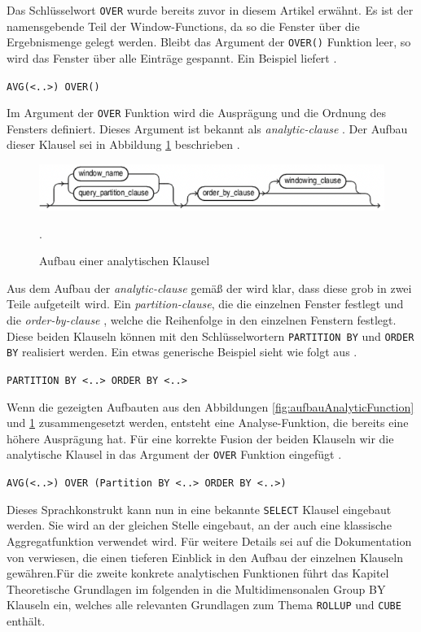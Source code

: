 Das Schlüsselwort \texttt{OVER} wurde bereits zuvor in diesem Artikel erwähnt.
Es ist der namensgebende Teil der Window-Functions, da so die Fenster über die Ergebnismenge
gelegt werden. Bleibt das Argument der \texttt{OVER()} Funktion leer, so wird
das Fenster über alle Einträge gespannt. Ein Beispiel liefert \citet[Seite 36]{Nuijten2023}.
\begin{center}
	\texttt{AVG(<..>) OVER()}
\end{center}
Im Argument der \texttt{OVER} Funktion wird die Ausprägung und die Ordnung des Fensters
definiert. Dieses Argument ist bekannt als \textit{analytic-clause} \citep[vgl.]{oracle}.
Der Aufbau dieser Klausel sei in Abbildung \ref{fig:aufbauAnalytischeKlausel} beschrieben
\citep[vgl.]{oracle}.
\begin{figure}[h]
	\centering
	\includegraphics[scale=0.5]{img/aufbauAnalyticClausel.jpg}
	\caption{ Aufbau einer analytischen Klausel \citep[vgl.][]{oracle}}
	. \label{fig:aufbauAnalytischeKlausel}
\end{figure}
Aus dem Aufbau der \textit{analytic-clause} gemäß der \citet{oracle} wird klar,
dass diese grob in zwei Teile aufgeteilt wird. Ein \textit{partition-clause}, die
die einzelnen Fenster festlegt und die \textit{order-by-clause} , welche die
Reihenfolge in den einzelnen Fenstern festlegt. Diese beiden Klauseln können mit
den Schlüsselwortern \texttt{PARTITION BY} und \texttt{ORDER BY} realisiert werden.
Ein etwas generische Beispiel sieht wie folgt aus \citep[vgl.]{oracle}.
\begin{center}
	\texttt{PARTITION BY <..> ORDER BY <..>}
\end{center}
Wenn die gezeigten Aufbauten aus den Abbildungen
\ref{fig:aufbauAnalyticFunction} und \ref{fig:aufbauAnalytischeKlausel}
zusammengesetzt werden, entsteht eine Analyse-Funktion, die bereits eine höhere
Ausprägung hat. Für eine korrekte Fusion der beiden Klauseln wir die analytische
Klausel in das Argument der \texttt{OVER} Funktion eingefügt \citep[vgl.][Seite
36]{Nuijten2023}.
\begin{center}
	\texttt{AVG(<..>) OVER (Partition BY <..> ORDER BY <..>)}
\end{center}
Dieses Sprachkonstrukt kann nun in eine bekannte \texttt{SELECT} Klausel
eingebaut werden. Sie wird an der gleichen Stelle eingebaut, an der auch eine
klassische Aggregatfunktion verwendet wird. Für weitere Details sei auf die Dokumentation
von \citet{oracle} verwiesen, die einen tieferen Einblick in den Aufbau der einzelnen
Klauseln gewähren.Für die zweite konkrete analytischen Funktionen führt das Kapitel
Theoretische Grundlagen im folgenden in die Multidimensonalen Group BY Klauseln ein,
welches alle relevanten Grundlagen zum Thema \texttt{ROLLUP} und \texttt{CUBE}
enthält.

